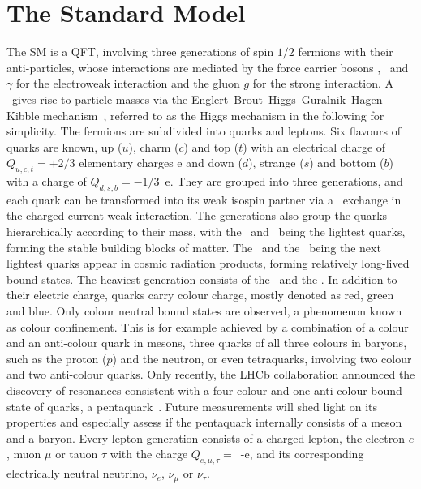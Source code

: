 \section{The Standard Model}
%
%
%
The \gls{SM} is a \gls{QFT}, involving three generations of spin $1/2$ fermions with their anti-particles, whose interactions are mediated by the force carrier bosons \Wbos, \Zbos\ and $\gamma$ for the electroweak interaction and the gluon $g$ for the strong interaction. 
%
A \Hboson\ gives rise to particle masses via the Englert--Brout--Higgs--Guralnik--Hagen--Kibble mechanism~\cite{PhysRevLett.13.321,Higgs1964132,PhysRevLett.13.508,PhysRevLett.13.585,PhysRev.145.1156,PhysRev.155.1554}, referred to as the Higgs mechanism in the following for simplicity. The fermions are subdivided into quarks and leptons. 
Six flavours of quarks are known, up ($u$), charm ($c$) and top ($t$) with an electrical charge of $Q_{u,c,t}=+2/3$ elementary charges e and down ($d$), strange ($s$) and bottom ($b$) with a charge of $Q_{d,s,b}=-1/3$~e. 
%
They are grouped into three generations, and each quark can be transformed into its weak isospin partner via a \Wboson\ exchange in the charged-current weak interaction. The generations also group the quarks hierarchically according to their mass, with the \uquark\ and \dquark\ being the lightest quarks, forming the stable building blocks of matter. The \squark\ and the \cquark\ being the next lightest quarks appear in cosmic radiation products, forming relatively long-lived bound states. The heaviest generation consists of the \bquark\ and the \tquark.
%
In addition to their electric charge, quarks carry colour charge, mostly denoted as red, green and blue. Only colour neutral bound states are observed, a phenomenon known as colour confinement. This is for example achieved by a combination of a colour and an anti-colour quark in mesons, three quarks of all three colours in baryons, such as the proton ($p$) and the neutron, or even tetraquarks, involving two colour and two anti-colour quarks. 
%
Only recently, the \gls{LHCb} collaboration announced the discovery of resonances consistent with a four colour and one anti-colour bound state of quarks, a pentaquark~\cite{PhysRevLett.115.072001}. Future measurements will shed light on its properties and especially assess if the pentaquark internally consists of a meson and a baryon. %
Every lepton generation consists of a charged lepton, the electron $e$, muon $\mu$ or tauon $\tau$ with the charge $Q_{e,\mu,\tau}=$~-e, and its corresponding electrically neutral neutrino, $\nu_e$, $\nu_\mu$ or $\nu_\tau$. 

